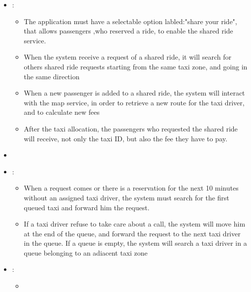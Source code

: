 \begin {itemize}
\begin{itemize}
	\end{itemize}
\item [G4]:%
	\begin{itemize}
	\item The application must have a selectable option labled:"share your ride", that allows passengers ,who reserved a ride, to enable the shared ride service.
	\item When the system receive a request of a shared ride, it will search for others shared ride requests starting from the same taxi zone, and going in the same direction %
	\item When a new passenger is added to a shared ride, the system will interact with the map service, in order to retrieve a new route for the taxi driver, and to calculate new fees
	\item After the taxi allocation, the passengers who requested the shared ride will receive, not only the taxi ID, but also the fee they have to pay.
	\end{itemize}
\item [G5] %

\item[G6]:
	\begin{itemize}
	\item When a request comes or there is a reservation for the next 10 minutes without an assigned taxi driver, the system must search for the first queued taxi and forward him the request.
	\item If a taxi driver refuse to take care about a call, the system will move him at the end of the queue, and forward the request to the next taxi driver in the queue. If a queue is empty, the system will search a taxi driver in a queue belonging to an adiacent taxi zone %
	\end{itemize}
\item [G7]:
	\begin{itemize}
	\item
	\end{itemize}
\end {itemize}
